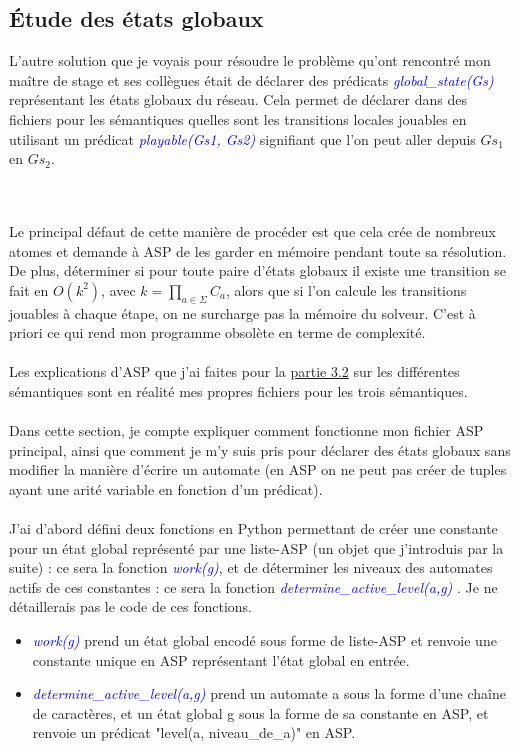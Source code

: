 \documentclass[12pt,a4paper]{article}
\begin{document}
\subsection{\'Etude des états globaux}
\hypertarget{partie4.4}{
L'autre solution que je voyais pour résoudre le problème qu'ont rencontré mon maître de stage et ses collègues était de déclarer des prédicats \emph{\textcolor{blue}{global\_state(Gs)}} représentant les états globaux du réseau. 
Cela permet de déclarer dans des fichiers pour les sémantiques quelles sont les transitions locales jouables en utilisant un prédicat \emph{\textcolor{blue}{playable(Gs1, Gs2)}} signifiant que l'on peut aller depuis 
$Gs_1$ en $Gs_2$.}\\ \\
Le principal défaut de cette manière de procéder est que cela crée de nombreux atomes et demande à ASP de les garder en mémoire pendant toute sa résolution. De plus, déterminer si pour toute paire d'états globaux il existe une 
transition se fait en $O(k^2)$, avec $k=\displaystyle{\prod_{a\in\Sigma}C_a}$, alors que si l'on calcule les transitions jouables à chaque étape, on ne surcharge pas la mémoire du solveur. C'est à priori ce qui rend mon programme 
obsolète en terme de complexité.\\ \\
Les explications d'ASP que j'ai faites pour la \hyperlink{semantiques}{partie 3.2} sur les différentes sémantiques sont en réalité mes propres fichiers pour les trois sémantiques.\\ \\
Dans cette section, je compte expliquer comment fonctionne mon fichier ASP principal, ainsi que comment je m'y suis pris pour déclarer des états globaux sans modifier la manière d'écrire un automate (en ASP on ne peut pas créer 
de tuples ayant une arité variable en fonction d'un prédicat).\\ \\
J'ai d'abord défini deux fonctions en Python permettant de créer une constante pour un état global représenté par une liste-ASP (un objet que j'introduis par la suite) : ce sera la fonction \emph{\textcolor{blue}{work(g)}}, et de 
déterminer les niveaux des automates actifs de ces constantes : ce sera la fonction \emph{\textcolor{blue}{determine\_active\_level(a,g)}} . Je ne détaillerais pas le code de ces fonctions.\\
\begin{itemize}
	\item\emph{\textcolor{blue}{work(g)}} prend un état global encodé sous forme de liste-ASP et renvoie une constante unique en ASP représentant l'état global en entrée.\\
	\item\emph{\textcolor{blue}{determine\_active\_level(a,g)}} prend un automate a sous la forme d'une chaîne de caractères, et un état global g sous la forme de sa constante en ASP, et renvoie un prédicat "level(a, 	
	niveau\_de\_a)" en ASP.
\end{itemize}
\end{document}

